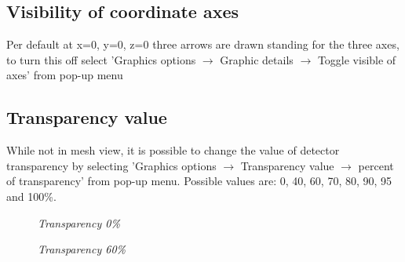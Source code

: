 \documentclass[a4paper,10pt]{article}
\begin{document}
\subsection{Visibility of coordinate axes}
Per default at x=0, y=0, z=0 three arrows are drawn standing for the three axes, to turn this off select 'Graphics options $\rightarrow$ Graphic details $\rightarrow$ Toggle visible of axes' from pop-up menu


\subsection{Transparency value}
While not in mesh view, it is possible to change the value of detector transparency by selecting 'Graphics options $\rightarrow$ Transparency value $\rightarrow$ percent of transparency' from pop-up menu. Possible values are: 0, 40, 60, 70, 80, 90, 95 and 100\%.


\begin{figure}[h!]
\begin{minipage}[t]{6cm}
\setlength{\fboxsep}{0mm}
\centerline{}
\caption{\label{CEDViewer} \textsl{Transparency 0\%}}
\end{minipage}
\hfill
\begin{minipage}[t]{6cm}
\setlength{\fboxsep}{0mm}
\centerline{}
\caption{\label{DSTViewer}\textsl{Transparency 60\%}}
\end{minipage}
\end{figure}
\end{document}

